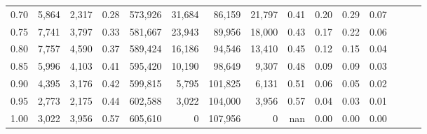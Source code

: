 \begin{tabular}{rrrrrrrrrrrrrrr}
0.70 &    5,864 &   2,317 &  0.28 &  573,926 &   31,684 &   86,159 &   21,797 &  0.41 &  0.20 &  0.29 &      0.07 \\
0.75 &    7,741 &   3,797 &  0.33 &  581,667 &   23,943 &   89,956 &   18,000 &  0.43 &  0.17 &  0.22 &      0.06 \\
0.80 &    7,757 &   4,590 &  0.37 &  589,424 &   16,186 &   94,546 &   13,410 &  0.45 &  0.12 &  0.15 &      0.04 \\
0.85 &    5,996 &   4,103 &  0.41 &  595,420 &   10,190 &   98,649 &    9,307 &  0.48 &  0.09 &  0.09 &      0.03 \\
0.90 &    4,395 &   3,176 &  0.42 &  599,815 &    5,795 &  101,825 &    6,131 &  0.51 &  0.06 &  0.05 &      0.02 \\
0.95 &    2,773 &   2,175 &  0.44 &  602,588 &    3,022 &  104,000 &    3,956 &  0.57 &  0.04 &  0.03 &      0.01 \\
1.00 &    3,022 &   3,956 &  0.57 &  605,610 &        0 &  107,956 &        0 &   nan &  0.00 &  0.00 &      0.00 \\
\bottomrule
\end{tabular}
